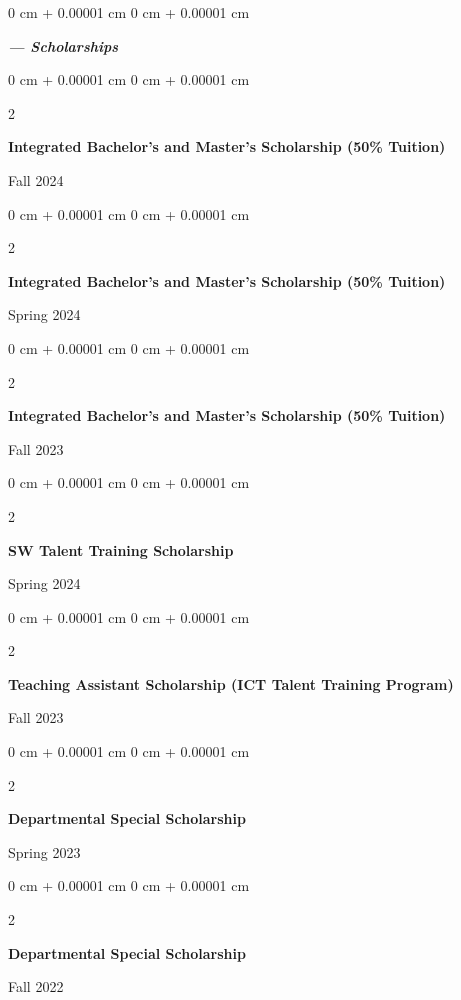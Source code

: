 \documentclass[11pt, letterpaper]{article}
\newenvironment{onecolentry}{
    \Needspace{3\baselineskip}
    \begin{adjustwidth}{
        0 cm + 0.00001 cm
    }{
        0 cm + 0.00001 cm
    }
}{
    \end{adjustwidth}
} %
\newenvironment{twocolentry}[2][]{
    \onecolentry
    \def\secondColumn{#2}
    \setcolumnwidth{\fill, 4.8 cm}
    \begin{paracol}{2}
}{
    \switchcolumn \raggedleft \secondColumn
    \end{paracol}
    \endonecolentry
} %
\begin{document}
    \vspace{0.5 cm}
    \begin{onecolentry}
        \textit{\textbf{--- Scholarships}}
    \end{onecolentry}
    \vspace{0.15 cm}

    \begin{twocolentry}
    {
        Fall 2024
    }
    {
        \textbf{Integrated Bachelor's and Master's Scholarship (50\% Tuition)}
    }
    \end{twocolentry}

    \vspace{0.25 cm}
    \begin{twocolentry}
    {
        Spring 2024
    }
    {
        \textbf{Integrated Bachelor's and Master's Scholarship (50\% Tuition)}
    }
    \end{twocolentry}

    \vspace{0.25 cm}
    \begin{twocolentry}
    {
        Fall 2023
    }
    {
        \textbf{Integrated Bachelor's and Master's Scholarship (50\% Tuition)}
    }
    \end{twocolentry}

    \vspace{0.25 cm}
    \begin{twocolentry}
    {
        Spring 2024
    }
    {
        \textbf{SW Talent Training Scholarship}
    }
    \end{twocolentry}

    \vspace{0.25 cm}
    \begin{twocolentry}
    {
        Fall 2023
    }
    {
        \textbf{Teaching Assistant Scholarship (ICT Talent Training Program)}
    }
    \end{twocolentry}

    \vspace{0.25 cm}
    \begin{twocolentry}
    {
        Spring 2023
    }
    {
        \textbf{Departmental Special Scholarship}
    }
    \end{twocolentry}

    \vspace{0.25 cm}
    \begin{twocolentry}
    {
        Fall 2022
    }
    {
        \textbf{Departmental Special Scholarship}
    }
    \end{twocolentry}
\end{document}

